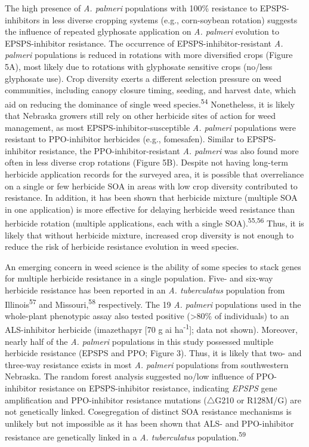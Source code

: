 \documentclass[
  12pt,
  a4paper]{article}
\begin{document}
The high presence of \emph{A. palmeri} populations with 100\% resistance
to EPSPS-inhibitors in less diverse cropping systems (e.g., corn-soybean
rotation) suggests the influence of repeated glyphosate application on
\emph{A. palmeri} evolution to EPSPS-inhibitor resistance. The
occurrence of EPSPS-inhibitor-resistant \emph{A. palmeri} populations is
reduced in rotations with more diversified crops (Figure 5A), most
likely due to rotations with glyphosate sensitive crops (no/less
glyphosate use). Crop diversity exerts a different selection pressure on
weed communities, including canopy closure timing, seeding, and harvest
date, which aid on reducing the dominance of single weed
species.\textsuperscript{54} Nonetheless, it is likely that Nebraska
growers still rely on other herbicide sites of action for weed
management, as most EPSPS-inhibitor-susceptible \emph{A. palmeri}
populations were resistant to PPO-inhibitor herbicides (e.g.,
fomesafen). Similar to EPSPS-inhibitor resistance, the
PPO-inhibitor-resistant \emph{A. palmeri} was also found more often in
less diverse crop rotations (Figure 5B). Despite not having long-term
herbicide application records for the surveyed area, it is possible that
overreliance on a single or few herbicide SOA in areas with low crop
diversity contributed to resistance. In addition, it has been shown that
herbicide mixture (multiple SOA in one application) is more effective
for delaying herbicide weed resistance than herbicide rotation (multiple
applications, each with a single SOA).\textsuperscript{55,56} Thus, it
is likely that without herbicide mixture, increased crop diversity is
not enough to reduce the risk of herbicide resistance evolution in weed
species.

An emerging concern in weed science is the ability of some species to
stack genes for multiple herbicide resistance in a single population.
Five- and six-way herbicide resistance has been reported in an \emph{A.
tuberculatus} population from Illinois\textsuperscript{57} and
Missouri,\textsuperscript{58} respectively. The 19 \emph{A. palmeri}
populations used in the whole-plant phenotypic assay also tested
positive (\textgreater80\% of individuals) to an ALS-inhibitor herbicide
(imazethapyr {[}70 g ai ha\textsuperscript{-1}{]}; data not shown).
Moreover, nearly half of the \emph{A. palmeri} populations in this study
possessed multiple herbicide resistance (EPSPS and PPO; Figure 3). Thus,
it is likely that two- and three-way resistance exists in most \emph{A.
palmeri} populations from southwestern Nebraska. The random forest
analysis suggested no/low influence of PPO-inhibitor resistance on
EPSPS-inhibitor resistance, indicating \emph{EPSPS} gene amplification
and PPO-inhibitor resistance mutations (\(\triangle\)G210 or R128M/G)
are not genetically linked. Cosegregation of distinct SOA resistance
mechanisms is unlikely but not impossible as it has been shown that ALS-
and PPO-inhibitor resistance are genetically linked in a \emph{A.
tuberculatus} population.\textsuperscript{59}
\end{document}
